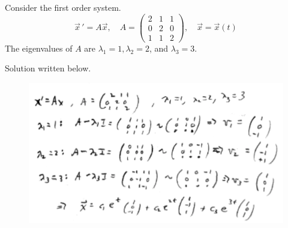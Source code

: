 \newpage 
\ifnum {}
\question[6] Consider the first order system. 
$$\vec x \, ' = A\vec x, \quad A = \begin{pmatrix} 2&1&1\\0&2&0\\1&1&2\end{pmatrix}, \quad \vec x = \vec x(t)  $$
The eigenvalues of $A$ are $\lambda_1 = 1, \lambda_2 = 2$, and $\lambda_3 = 3$. 

\ifnum {} {\color{DarkBlue} Solution written below. 
    \begin{figure}[h]
    \centering
    \includegraphics[width=14cm]{Images/ImgTest2System.png}
    \end{figure}  

} 
\else 
\vspace{3cm}
\fi
\fi

